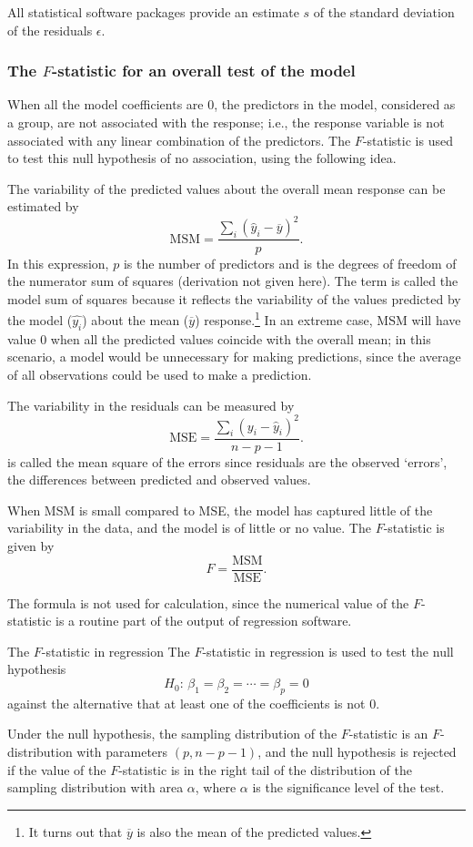 All statistical software packages provide an estimate $s$ of the standard deviation of the residuals $\epsilon$.


\subsubsection{The $F$-statistic for an overall test of the model}

When all the model coefficients are 0, the predictors in the model, considered as a group, are not associated with the response; i.e., the response variable is not associated with any linear combination of the predictors. The $F$-statistic is used to test this null hypothesis of no association, using the following idea.  

The variability of the predicted values about the overall mean response can be estimated by
\[
   \text{MSM} =  \frac{\sum_i(\hat{y}_i - \overline{y})^2}{p}.
\]
In this expression, $p$ is the number of predictors and is the degrees of freedom of the numerator sum of squares (derivation not given here).  The term  is called the model sum of squares because it reflects the variability of the values predicted by the model ($\hat{y_i}$) about the mean ($\overline{y}$) response.\footnote{It turns out that $\overline{y}$ is also the mean of the predicted values.} In an extreme case, MSM will have value 0 when all the predicted values coincide with the overall mean; in this scenario, a model would be unnecessary for making predictions, since the average of all observations could be used to make a prediction.

The variability in the residuals can be measured by 
\[
  \text{MSE} = \frac{\sum_i(y_i - \hat{y}_i)^2}{n - p - 1}.
\]
 is called the mean square of the errors since residuals are the observed `errors', the differences between predicted and observed
values.

When MSM is small compared to MSE, the model has captured little of the variability in the data, and the model is of little or no value.  The $F$-statistic is given by
\[
  F = \frac{\text{MSM}}{\text{MSE}}.
\]

The formula is not used for calculation, since the numerical value of the $F$-statistic is a routine part of the output of regression software.

\textD{\newpage}

\begin{onebox}{The $F$-statistic in regression}
The $F$-statistic in regression is used to test the null hypothesis 
\[
  H_0:\, \beta_1 = \beta_2 = \cdots = \beta_p = 0
\]
against the alternative that at least one of the coefficients is not 0.\vspace{3mm}

Under the null hypothesis, the sampling distribution of the $F$-statistic is an $F$-distribution with parameters $(p, n - p - 1)$, and the null hypothesis is rejected if the value of the $F$-statistic is in the right tail of the distribution of the sampling distribution with area $\alpha$, where $\alpha$ is the significance level of the test.
\end{onebox}


